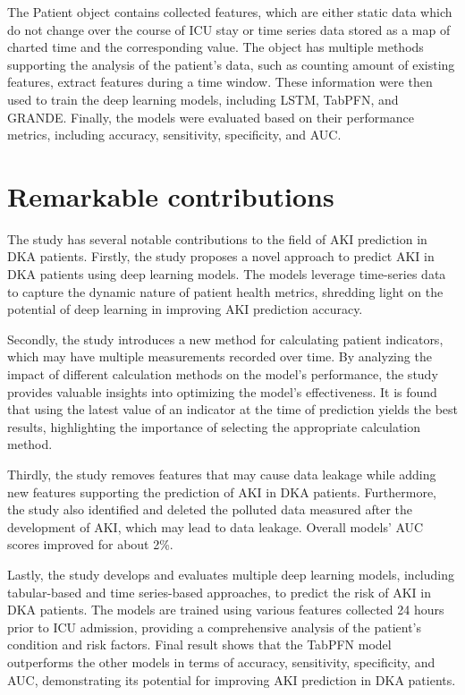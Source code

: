 \documentclass[../main.tex]{subfiles}
\begin{document}
The Patient object contains collected features, which are either static data which do not change over the course of ICU stay or time series data stored as a map of charted time and the corresponding value.
The object has multiple methods supporting the analysis of the patient's data, such as counting amount of existing features, extract features during a time window.
These information were then used to train the deep learning models, including \gls{LSTM}, TabPFN, and GRANDE.
Finally, the models were evaluated based on their performance metrics, including accuracy, sensitivity, specificity, and \gls{AUC}.


\section{Remarkable contributions}

The study has several notable contributions to the field of AKI prediction in DKA patients. 
Firstly, the study proposes a novel approach to predict AKI in DKA patients using deep learning models.
The models leverage time-series data to capture the dynamic nature of patient health metrics, shredding light on the potential of deep learning in improving AKI prediction accuracy.

Secondly, the study introduces a new method for calculating patient indicators, which may have multiple measurements recorded over time.
By analyzing the impact of different calculation methods on the model's performance, the study provides valuable insights into optimizing the model's effectiveness.
It is found that using the latest value of an indicator at the time of prediction yields the best results, highlighting the importance of selecting the appropriate calculation method.

Thirdly, the study removes features that may cause data leakage while adding new features supporting the prediction of AKI in DKA patients. 
Furthermore, the study also identified and deleted the polluted data measured after the development of AKI, which may lead to data leakage.
Overall models' AUC scores improved for about 2\%.

Lastly, the study develops and evaluates multiple deep learning models, including tabular-based and time series-based approaches, to predict the risk of AKI in DKA patients.
The models are trained using various features collected 24 hours prior to ICU admission, providing a comprehensive analysis of the patient's condition and risk factors.
Final result shows that the TabPFN model outperforms the other models in terms of accuracy, sensitivity, specificity, and AUC, demonstrating its potential for improving AKI prediction in DKA patients.
\end{document}
